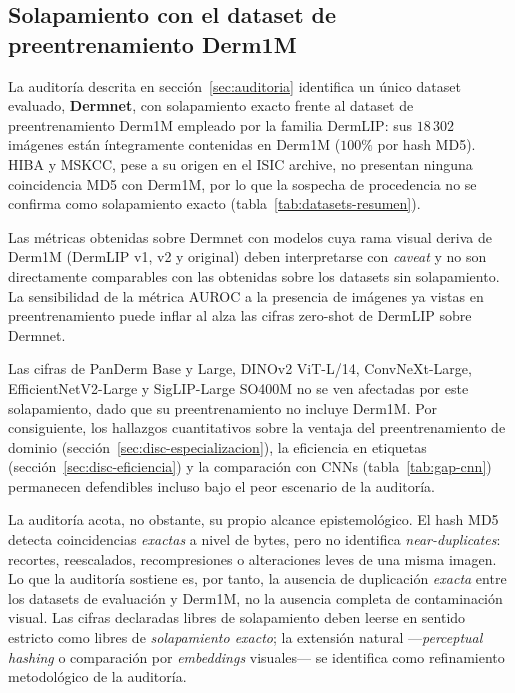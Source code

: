\subsection{Solapamiento con el dataset de preentrenamiento Derm1M}
\label{sec:lim-leakage}

La auditoría descrita en sección~\ref{sec:auditoria} identifica un
único dataset evaluado, \textbf{Dermnet}, con solapamiento exacto
frente al dataset de preentrenamiento Derm1M empleado por la familia
DermLIP: sus $18\,302$ imágenes están íntegramente contenidas en
Derm1M ($100\%$ por hash MD5). HIBA y MSKCC, pese a su origen en el
ISIC archive, no presentan ninguna coincidencia MD5 con Derm1M, por
lo que la sospecha de procedencia no se confirma como solapamiento
exacto (tabla~\ref{tab:datasets-resumen}).

Las métricas obtenidas sobre Dermnet con modelos cuya rama visual
deriva de Derm1M (DermLIP v1, v2 y original) deben interpretarse con
\emph{caveat} y no son directamente comparables con las obtenidas
sobre los datasets sin solapamiento. La sensibilidad de la métrica
AUROC a la presencia de imágenes ya vistas en preentrenamiento puede
inflar al alza las cifras zero-shot de DermLIP sobre Dermnet.

Las cifras de PanDerm Base y Large, DINOv2 ViT-L/14,
ConvNeXt-Large, EfficientNetV2-Large y SigLIP-Large SO400M no se
ven afectadas por este solapamiento, dado que su preentrenamiento
no incluye Derm1M. Por consiguiente, los hallazgos cuantitativos
sobre la ventaja del preentrenamiento de dominio
(sección~\ref{sec:disc-especializacion}), la eficiencia en etiquetas
(sección~\ref{sec:disc-eficiencia}) y la comparación con CNNs
(tabla~\ref{tab:gap-cnn}) permanecen defendibles incluso bajo el
peor escenario de la auditoría.

La auditoría acota, no obstante, su propio alcance epistemológico. El
hash MD5 detecta coincidencias \emph{exactas} a nivel de bytes, pero
no identifica \emph{near-duplicates}: recortes, reescalados,
recompresiones o alteraciones leves de una misma imagen. Lo que la
auditoría sostiene es, por tanto, la ausencia de duplicación
\emph{exacta} entre los datasets de evaluación y Derm1M, no la
ausencia completa de contaminación visual. Las cifras declaradas
libres de solapamiento deben leerse en sentido estricto como libres de
\emph{solapamiento exacto}; la extensión natural ---\emph{perceptual
hashing} o comparación por \emph{embeddings} visuales--- se identifica
como refinamiento metodológico de la auditoría.

